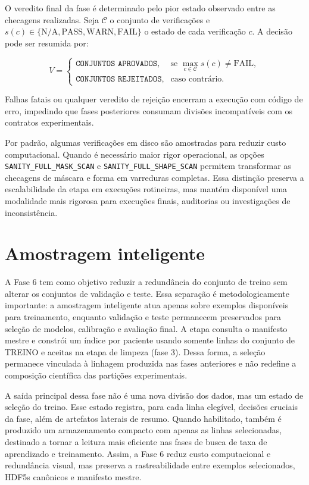 O veredito final da fase é determinado pelo pior estado observado entre as
checagens realizadas. Seja $\mathcal{C}$ o conjunto de verificações e
$s(c)\in\{\mathrm{N/A},\mathrm{PASS},\mathrm{WARN},\mathrm{FAIL}\}$ o estado de
cada verificação $c$. A decisão pode ser resumida por:

\begin{equation}
    V =
    \begin{cases}
        \texttt{CONJUNTOS\ APROVADOS}, & \text{se } \max_{c\in\mathcal{C}} s(c)
        \neq \mathrm{FAIL},\\
        \texttt{CONJUNTOS\ REJEITADOS}, & \text{caso contrário}.
    \end{cases}
    \label{eq:sanity_verdict}
\end{equation}

Falhas fatais ou
qualquer veredito de rejeição encerram a execução com código de erro, impedindo
que fases posteriores consumam divisões incompatíveis com os contratos
experimentais.

Por padrão, algumas verificações em disco são amostradas para reduzir custo
computacional. Quando é necessário maior rigor operacional, as opções
\texttt{SANITY\_FULL\_MASK\_SCAN} e \texttt{SANITY\_FULL\_SHAPE\_SCAN}
permitem transformar as checagens de máscara e forma em varreduras completas.
Essa distinção preserva a escalabilidade da etapa em execuções rotineiras, mas
mantém disponível uma modalidade mais rigorosa para execuções finais,
auditorias ou investigações de inconsistência.

\section{Amostragem inteligente}\label{sec:met_amostragem_inteligente}

A Fase 6 tem como objetivo reduzir a redundância do conjunto de treino sem
alterar os conjuntos de validação e teste. Essa separação é metodologicamente
importante: a amostragem inteligente atua apenas sobre exemplos disponíveis para
treinamento, enquanto validação e teste permanecem preservados para seleção de
modelos, calibração e avaliação final. A etapa consulta o
manifesto mestre e constrói um índice por paciente usando
somente linhas do conjunto de TREINO e
aceitas na etapa de limpeza (fase 3). Dessa forma, a seleção permanece vinculada à
linhagem produzida nas fases anteriores e não redefine a composição científica
das partições experimentais.

A saída principal dessa fase não é uma nova divisão dos dados, mas um estado de
seleção do treino. Esse estado registra, para cada linha elegível, decisões cruciais da fase, além de artefatos
laterais de resumo. Quando habilitado, também é produzido um armazenamento
compacto com apenas as linhas selecionadas, destinado a tornar a leitura mais
eficiente nas fases de busca de taxa de aprendizado e treinamento. Assim, a Fase
6 reduz custo computacional e redundância visual, mas preserva a rastreabilidade
entre exemplos selecionados, HDF5s canônicos e manifesto mestre.

